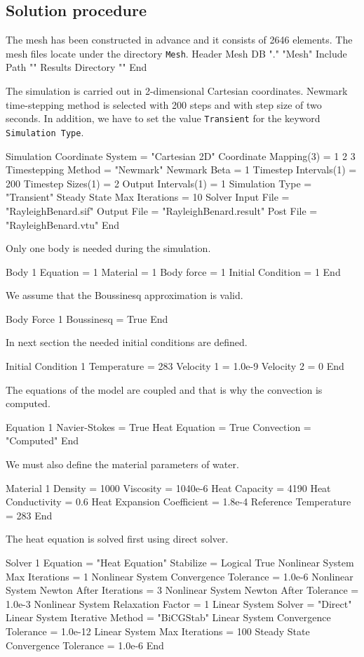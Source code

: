 \begin{flushleft}
\subsection*{Solution procedure}

The mesh has been constructed in advance and it consists of 2646 elements. 
The mesh files locate under the directory {\tt Mesh}.
\ttbegin
Header
  Mesh DB "." "Mesh"
  Include Path ""
  Results Directory ""
End
\ttend

The simulation is carried out in 2-dimensional Cartesian coordinates. Newmark time-stepping method is selected with 200 steps and with step size of two seconds. In addition, we have to set the value {\tt Transient} for the keyword {\tt Simulation Type}.

\ttbegin
Simulation
  Coordinate System = "Cartesian 2D" 
  Coordinate Mapping(3) = 1 2 3
  Timestepping Method = "Newmark"
  Newmark Beta = 1
  Timestep Intervals(1) = 200
  Timestep Sizes(1) = 2
  Output Intervals(1) = 1
  Simulation Type = "Transient" 
  Steady State Max Iterations = 10
  Solver Input File = "RayleighBenard.sif"
  Output File = "RayleighBenard.result" 
  Post File = "RayleighBenard.vtu"
End
\ttend

Only one body is needed during the simulation.

\ttbegin
Body 1
  Equation = 1
  Material = 1
  Body force = 1
  Initial Condition = 1
End
\ttend

We assume that the Boussinesq approximation is valid.

\ttbegin
Body Force 1
  Boussinesq = True
End
\ttend

In next section the needed initial conditions are defined.

\ttbegin
Initial Condition 1
  Temperature = 283
  Velocity 1 = 1.0e-9
  Velocity 2 = 0
End
\ttend

The equations of the model are coupled and that is why the convection is computed.

\ttbegin
Equation 1
  Navier-Stokes = True
  Heat Equation = True
  Convection = "Computed"
End
\ttend

We must also define the material parameters of water.

\ttbegin
Material 1
  Density = 1000
  Viscosity = 1040e-6
  Heat Capacity = 4190
  Heat Conductivity = 0.6
  Heat Expansion Coefficient = 1.8e-4
  Reference Temperature = 283
End
\ttend

The heat equation is solved first using direct solver. 

\ttbegin
Solver 1
  Equation = "Heat Equation"
  Stabilize = Logical True
  Nonlinear System Max Iterations = 1
  Nonlinear System Convergence Tolerance = 1.0e-6
  Nonlinear System Newton After Iterations = 3 
  Nonlinear System Newton After Tolerance = 1.0e-3
  Nonlinear System Relaxation Factor = 1
  Linear System Solver = "Direct"
  Linear System Iterative Method = "BiCGStab"
  Linear System Convergence Tolerance = 1.0e-12
  Linear System Max Iterations = 100
  Steady State Convergence Tolerance = 1.0e-6
End
\ttend


\end{flushleft}
